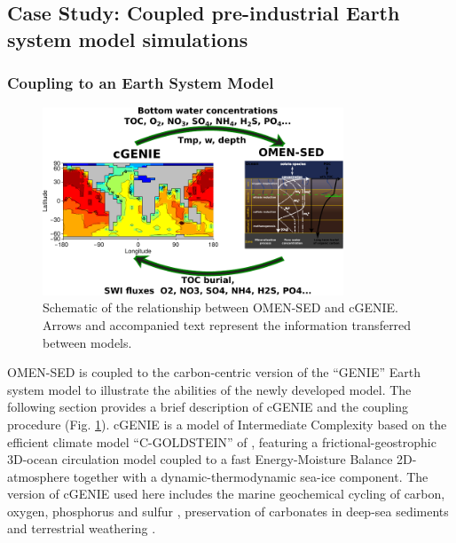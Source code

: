 \documentclass[gmd, manuscript]{copernicus}
\begin{document}
\subsection{Case Study: Coupled pre-industrial Earth system model simulations}
\subsubsection{Coupling to an Earth System Model}\label{subsubsec:Methods_ESM_coupling}
\begin{figure}[tbp]
\begin{center}
	\includegraphics[width=0.8\textwidth]{figures/OMEN-GENIE-coupling.pdf}
	\caption{Schematic of the relationship between OMEN-SED and cGENIE. Arrows and accompanied text represent the information transferred between models. }
	\label{fig:OMEN-GENIE-coupling}
	\end{center}
\end{figure}
OMEN-SED is coupled to the carbon-centric version of the ``GENIE'' Earth system model \citep[cGENIE,][]{ridgwell_marine_2007} to illustrate the abilities of the newly developed model. 
The following section provides a brief description of cGENIE and the coupling procedure (Fig. \ref{fig:OMEN-GENIE-coupling}). 
cGENIE is a model of Intermediate Complexity based on the efficient climate model ``C-GOLDSTEIN''  of \citet{edwards_uncertainties_2005}, featuring a frictional-geostrophic 3D-ocean circulation model coupled to a fast 
Energy-Moisture Balance 2D-atmosphere together with a dynamic-thermodynamic sea-ice component. 
The version of cGENIE used here includes the marine geochemical cycling of carbon, oxygen, phosphorus and sulfur \citep{ridgwell_marine_2007}, 
preservation of carbonates in deep-sea sediments \citep[SEDGEM,][]{ridgwell_regulation_2007} and terrestrial weathering \citep{colbourn_rock_2013}. 
\end{document}
